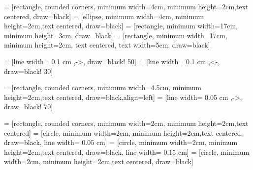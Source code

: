 \newcommand{\appref}[1]{Appendix~\ref{#1}}
\newcommand{\fnref}[1]{Footnote~\ref{#1}} 

\newenvironment{langscibars}{\begin{axis}[ybar,xtick=data, xticklabels from table={\mydata}{pos}, 
        width  = \textwidth,
	height = .3\textheight,
    	nodes near coords, 
	xtick=data,
	x tick label style={},  
	ymin=0,
	cycle list name=langscicolors
        ]}{\end{axis}}
        
\newcommand{\langscibar}[1]{\addplot+ table [x=i, y=#1] {\mydata};\addlegendentry{#1};}

\newcommand{\langscidata}[1]{\pgfplotstableread{#1}\mydata;}



\newcommand\Umbruch[2][3cm]{\begin{varwidth}{#1}\centering#2   \end{varwidth}}

\newcommand{\prefix}[1]{\textit{#1\hbox{-}}}
\newcommand{\suffix}[1]{\textit{\hbox{-}#1}}
\newcommand{\newterm}[1]{\textsc{#1}}


 = [rectangle, rounded corners, minimum width=4cm, minimum height=2cm,text centered, draw=black]
 = [ellipse, minimum width=4cm, minimum height=2cm,text centered, draw=black]
 = [rectangle, minimum width=17cm, minimum height=3cm, draw=black] %
 = [rectangle, minimum width=17cm, minimum height=2cm, text centered, text width=5cm, draw=black]

 = [line width= 0.1 cm ,->, draw=black! 50]
 = [line width= 0.1 cm ,<-, draw=black! 30]



 = [rectangle, rounded corners, minimum width=4.5cm, minimum height=2cm,text centered, draw=black,align=left] %
 = [line width= 0.05 cm ,->, draw=black! 70]



 = [rectangle, rounded corners, minimum width=2cm, minimum height=2cm,text centered]
 = [circle, minimum width=2cm, minimum height=2cm,text centered, draw=black, line width= 0.05 cm]
 = [circle, minimum width=2cm, minimum height=2cm,text centered, draw=black, line width= 0.15 cm]
 = [circle, minimum width=2cm, minimum height=2cm,text centered, draw=black]

